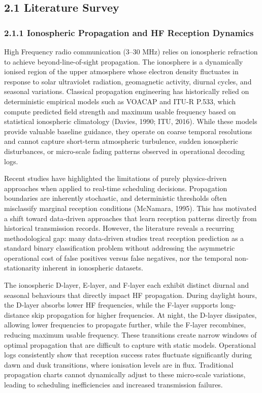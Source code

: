 \subsection{2.1 Literature Survey}\label{literature-survey}

\subsubsection{2.1.1 Ionospheric Propagation and HF Reception
Dynamics}\label{ionospheric-propagation-and-hf-reception-dynamics}

High Frequency radio communication (3--30 MHz) relies on ionospheric
refraction to achieve beyond-line-of-sight propagation. The ionosphere
is a dynamically ionised region of the upper atmosphere whose electron
density fluctuates in response to solar ultraviolet radiation,
geomagnetic activity, diurnal cycles, and seasonal variations. Classical
propagation engineering has historically relied on deterministic
empirical models such as VOACAP and ITU-R P.533, which compute predicted
field strength and maximum usable frequency based on statistical
ionospheric climatology (Davies, 1990; ITU, 2016). While these models
provide valuable baseline guidance, they operate on coarse temporal
resolutions and cannot capture short-term atmospheric turbulence, sudden
ionospheric disturbances, or micro-scale fading patterns observed in
operational decoding logs.

Recent studies have highlighted the limitations of purely physics-driven
approaches when applied to real-time scheduling decisions. Propagation
boundaries are inherently stochastic, and deterministic thresholds often
misclassify marginal reception conditions (McNamara, 1995). This has
motivated a shift toward data-driven approaches that learn reception
patterns directly from historical transmission records. However, the
literature reveals a recurring methodological gap: many data-driven
studies treat reception prediction as a standard binary classification
problem without addressing the asymmetric operational cost of false
positives versus false negatives, nor the temporal non-stationarity
inherent in ionospheric datasets.

The ionospheric D-layer, E-layer, and F-layer each exhibit distinct
diurnal and seasonal behaviours that directly impact HF propagation.
During daylight hours, the D-layer absorbs lower HF frequencies, while
the F-layer supports long-distance skip propagation for higher
frequencies. At night, the D-layer dissipates, allowing lower
frequencies to propagate further, while the F-layer recombines, reducing
maximum usable frequency. These transitions create narrow windows of
optimal propagation that are difficult to capture with static models.
Operational logs consistently show that reception success rates
fluctuate significantly during dawn and dusk transitions, where
ionisation levels are in flux. Traditional propagation charts cannot
dynamically adjust to these micro-scale variations, leading to
scheduling inefficiencies and increased transmission failures.


